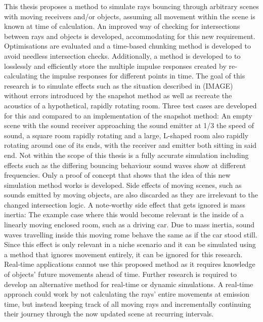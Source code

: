 This thesis proposes a method to simulate rays bouncing through arbitrary scenes with moving receivers and/or objects,
assuming all movement within the scene is known at time of calculation.
An improved way of checking for intersections between rays and objects is developed, accommodating for this new requirement.
Optimisations are evaluated and a time-based chunking method is developed to avoid needless intersection checks.
Additionally, a method is developed to to losslessly and efficiently store the multiple impulse responses created by re-calculating
the impulse responses for different points in time.
The goal of this research is to simulate effects such as the situation described in (IMAGE) without errors introduced by the snapshot method
as well as recreate the acoustics of a hypothetical, rapidly rotating room.
Three test cases are developed for this and compared to an implementation of the snapshot method:
An empty scene with the sound receiver approaching the sound emitter at 1/3 the speed of sound,
a square room rapidly rotating
and a large, L-shaped room also rapidly rotating around one of its ends, with the receiver and emitter both sitting in said end.
\newline
Not within the scope of this thesis is a fully accurate simulation
including effects such as the differing bouncing behaviour sound waves show at different frequencies.
Only a proof of concept that shows that the idea of this new simulation method works is developed.
\newline
Side effects of moving scenes, such as sounds emitted by moving objects, are also discarded as they are irrelevant to
the changed intersection logic.
A note-worthy side effect that gets ignored is mass inertia:
The example case where this would become relevant is the inside of a linearly moving enclosed room, such as a driving car.
Due to mass inertia, sound waves travelling inside this moving rome behave the same as if the car stood still.
Since this effect is only relevant in a niche scenario and it can be simulated using a method that ignores movement entirely,
it can be ignored for this research.
\newline
Real-time applications cannot use this proposed method as it requires knowledge of objects' future movements ahead of time.
Further research is required to develop an alternative method for real-time or dynamic simulations.
A real-time approach could work by not calculating the rays' entire movements at emission time,
but instead keeping track of all moving rays and incrementally continuing their journey through the now updated scene
at recurring intervals.
